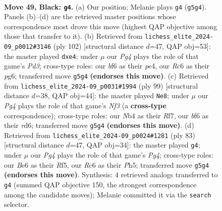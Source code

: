 \documentclass[11pt]{article}
\begin{document}
\clearpage

\begin{figure}[p]\centering
\begin{subfigure}{0.46\textwidth}\centering
\resizebox{\linewidth}{!}{%
\newchessgame
\chessboard[
  setfen={4k3/1R6/2r1bB2/rp4p1/1n6/4P1PP/4RP1K/8 b - - 8 49},
  showmover=false,
  pgfstyle=straightmove, color=movearrow, markmove={g5-g4}
]}
\caption{}
\end{subfigure}\hfill
\begin{subfigure}{0.46\textwidth}\centering
\resizebox{\linewidth}{!}{%
\newchessgame
\chessboard[
  setfen={7R/3b3P/3k2p1/2p4r/p1B1p3/P2P2K1/8/8 w - - 0 52},
  showmover=false,
  pgfstyle=straightmove, color=movearrow, markmove={d3-e4}
]}
\caption{}
\end{subfigure}
\\[4pt]
\begin{subfigure}{0.46\textwidth}\centering
\resizebox{\linewidth}{!}{%
\newchessgame
\chessboard[
  setfen={5k2/5r2/3R1n2/1RP4p/p6P/b4PP1/P5K1/8 b - - 0 50},
  showmover=false,
  pgfstyle=straightmove, color=movearrow, markmove={f6-e8}
]}
\caption{}
\end{subfigure}\hfill
\begin{subfigure}{0.46\textwidth}\centering
\resizebox{\linewidth}{!}{%
\newchessgame
\chessboard[
  setfen={8/3k4/8/pR2prpp/r7/6P1/2R2PKP/8 b - - 11 42},
  showmover=false,
  pgfstyle=straightmove, color=movearrow, markmove={g5-g4}
]}
\caption{}
\end{subfigure}
\caption{\textbf{Move 49, Black: \texttt{g4}.} (a) Our position; Melanie plays \texttt{g4} (\texttt{g5g4}). Panels (b)--(d) are the retrieved master positions whose correspondence most drove this move (highest QAP objective among those that transfer to it). (b) Retrieved from \texttt{lichess\_elite\_2024-09\_p0012\#3146} (ply 102) [structural distance $d$=47, QAP obj=53]: the master played \texttt{dxe4}; under $\mu$ our \emph{Pg4} plays the role of that game's \emph{Pd3}; cross-type roles: our \emph{b}f6 as their \emph{p}e4, our \emph{R}c6 as their \emph{p}g6; transferred move \texttt{g5g4} \textbf{(endorses this move)}. (c) Retrieved from \texttt{lichess\_elite\_2024-09\_p0031\#1994} (ply 99) [structural distance $d$=38, QAP obj=44]: the master played \texttt{Ne8}; under $\mu$ our \emph{Pg4} plays the role of that game's \emph{Nf3} (a \textbf{cross-type} correspondence); cross-type roles: our \emph{N}b4 as their \emph{R}f7, our \emph{b}f6 as their \emph{r}d6; transferred move \texttt{g5g4} \textbf{(endorses this move)}. (d) Retrieved from \texttt{lichess\_elite\_2024-09\_p0024\#1281} (ply 83) [structural distance $d$=47, QAP obj=34]: the master played \texttt{g4}; under $\mu$ our \emph{Pg4} plays the role of that game's \emph{Pg4}; cross-type roles: our \emph{B}e6 as their \emph{R}f5, our \emph{R}c6 as their \emph{P}h5; transferred move \texttt{g5g4} \textbf{(endorses this move)}. Synthesis: 4 retrieved analogs transferred to \texttt{g4} (summed QAP objective 150, the strongest correspondence among the candidate moves); Melanie committed it via the \texttt{search} selector.}
\label{fig:thought-m97}
\end{figure}
\end{document}
